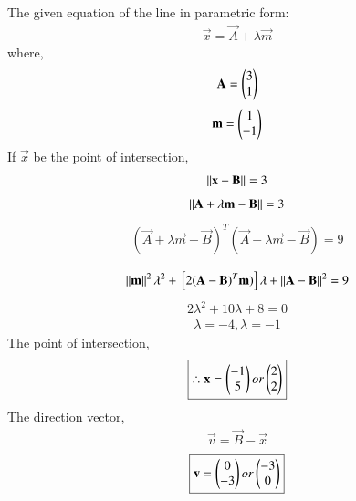 The given equation of the line in parametric form:
\begin{align}
\vec{x} = \vec{A} + \lambda \vec{m} 
\end{align}
where,
\begin{align}
\mathbf{A} = \begin{pmatrix}3\\1\end{pmatrix}
\end{align}
\begin{align}
\mathbf{m} = \begin{pmatrix}1\\-1\end{pmatrix}
\end{align}
If $\vec{x}$ be the point of intersection, 
\begin{align}
	\left\lVert\mathbf{x}-\mathbf{B}\right\rVert=3 
\end{align}
\begin{align}
	\left\lVert\mathbf{A}+\lambda \mathbf{m}-\mathbf{B}\right\rVert=3 
\end{align}
\begin{align}
	(\vec{A}+\lambda\vec{m}-\vec{B})^T (\vec{A}+\lambda\vec{m}-\vec{B}) =9
\end{align}
\begin{align}
	[(\vec{A}-\vec{B})^T\vec{m} = \vec{m}^T(\vec{A}-\vec{B})]
\end{align}
\begin{align}
	\left\lVert\mathbf{m}\right\rVert^2 \lambda^2+ {}\left[2(\mathbf{A}-\mathbf{B})^T\mathbf{m})\right] \lambda + \left\lVert\mathbf{A}-\mathbf{B}\right\rVert^2=9
\end{align}
\begin{align}
	2\lambda^2+ 10\lambda+8=0 
\end{align} 
\begin{align}
	\lambda=-4,  \lambda=-1 
\end{align} 
The point of intersection,
\begin{align}
	\boxed{\therefore \mathbf{x}=\begin{pmatrix}-1\\5\end{pmatrix} or \begin{pmatrix}2\\2\end{pmatrix}}
\end{align} 
The direction vector, 
    \begin{align}
		\vec{v} = \vec{B}-\vec{x}
	\end{align}
	\begin{align}
		\boxed{\mathbf{v} = \begin{pmatrix}0 \\ -3\end{pmatrix} or \begin{pmatrix}-3 \\ 0\end{pmatrix}}
	\end{align}
%
